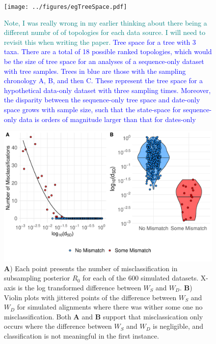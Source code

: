 \documentclass{article}
\begin{document}
{\begin{figure}[H]
\centering
\texttt{[image: ../figures/egTreeSpace.pdf]}
\caption{\textcolor{teal}{Note, I was really wrong in my earlier thinking about there being a different numbr of of topologies for each data source. I will need to revisit this when writing the paper. }\textcolor{blue}{Tree space for a tree with 3 taxa. There are a total of 18 possible ranked topologies, which would be the size of tree space for an analyses of a sequence-only dataset with tree samples. Trees in blue are those with the sampling chronology A, B, and then C. These represent the tree space for a hypothetical data-only dataset with three sampling times. Moreover, the disparity between the sequence-only tree space and date-only space grows with sample size, such that the state-space for sequence-only data is orders of magnitude larger than that for dates-only}}
\label{fig:treeSpace}
\end{figure}


\begin{figure}[H]
\centering
\includegraphics[width=1\linewidth]{../figures/errorWasserstein.pdf}
\caption{ \textbf{A}) Each point presents the number of misclassification in subsampling posterior $R_0$ for each of the 600 simulated datasets. X-axis is the log transformed difference between $W_S$ and $W_D$. \textbf{B}) Violin plots with jittered points of the difference between $W_S$ and $W_D$ for simulated alignments where there was wither some one no misclassification. Both \textbf{A} and \textbf{B} support that misclassication only occurs where the difference between $W_S$ and $W_D$ is negligible, and classification is not meaningful in the first instance.}
\label{fig:validateW}
\end{figure}

}
\end{document}
